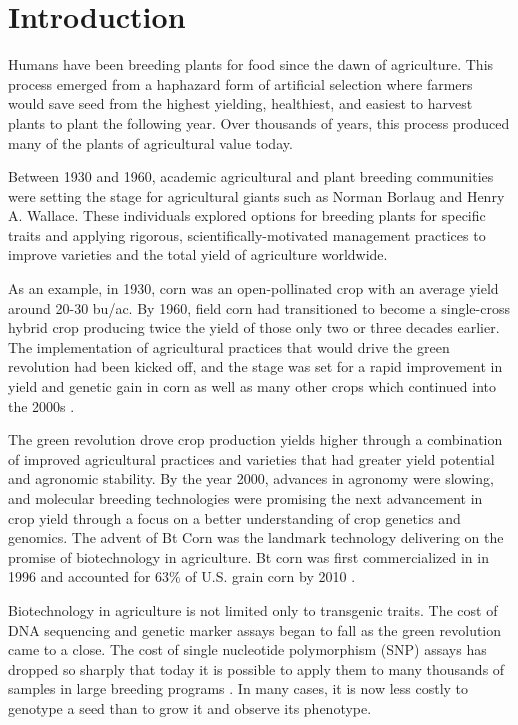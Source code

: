 \section{Introduction} \label{sec:gen-intro}

Humans have been breeding plants for food since the dawn of agriculture. This process
emerged from a haphazard form of artificial selection where farmers would save seed from the 
highest yielding, healthiest, and easiest to harvest plants to plant the following year. 
Over thousands of years, this process produced many of the plants of  
agricultural value today.

Between 1930 and 1960, academic agricultural and plant breeding communities were setting the
stage for agricultural giants such as Norman Borlaug and Henry A. Wallace. These individuals 
explored options for breeding plants for specific traits and applying rigorous, 
scientifically-motivated management practices to improve varieties and the total yield 
of agriculture worldwide.

As an example, in 1930, corn was an open-pollinated crop with an average 
yield around 20-30 bu/ac. By 1960, field corn had transitioned to become a single-cross 
hybrid crop producing twice the yield of those only two or three decades earlier. The implementation
of agricultural practices that would drive the green revolution had been kicked off, and
the stage was set for a rapid improvement in yield and genetic gain in
corn as well as many other crops which continued into the 2000s \citep{evenson2003}.

The green revolution drove crop production yields higher through a combination of 
improved agricultural practices and varieties that had greater yield potential
and agronomic stability. By the year 2000, advances in agronomy were slowing, and 
molecular breeding technologies were promising the next advancement in crop yield
through a focus on a better understanding of crop genetics and genomics. 
The advent of Bt Corn was the landmark technology delivering on the promise of 
biotechnology in agriculture. Bt corn was first commercialized in in 1996 and 
accounted for 63\% of U.S. grain corn by 2010 \citep{fernandez2012}. 

Biotechnology in agriculture is not limited only to transgenic traits. The cost of 
DNA sequencing and genetic marker assays began to fall as the green revolution
came to a close. The cost of single nucleotide polymorphism (SNP) assays has dropped so sharply that today it is 
possible to apply them to many thousands of samples in large breeding programs \citep{hiremath2012}. 
In many cases, it is now less costly to genotype a seed than to grow it and observe its phenotype.

